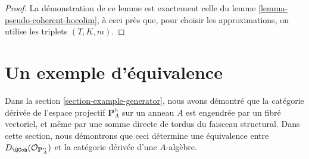 \begin{proof}
La démonstration de ce lemme est exactement celle du
lemme \ref{lemma-pseudo-coherent-hocolim},
à ceci près que, pour choisir les approximations, on utilise
les triplets $(T, K, m)$.
\end{proof}









\section{Un exemple d'équivalence}
\label{section-example-equivalence}

\noindent
Dans la section \ref{section-example-generator},
nous avons démontré que la catégorie dérivée de l'espace projectif $\mathbf{P}^n_A$
sur un anneau $A$ est engendrée par un fibré vectoriel, et même par une somme
directe de tordus du faisceau structural. Dans cette section, nous démontrons que ceci
détermine une équivalence entre $D_\QCoh(\mathcal{O}_{\mathbf{P}^n_A})$
et la catégorie dérivée d'une $A$-algèbre.

